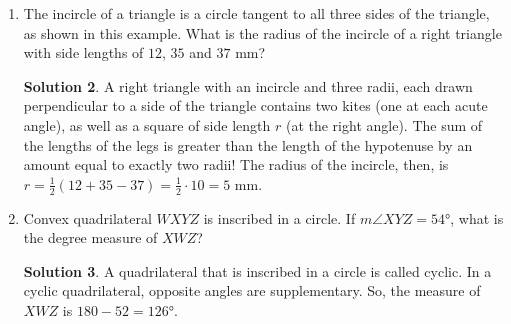 \documentclass{article}
\makeatletter
\newcommand{\arc@char}{{\usefont{U}{tipa}{m}{n}\symbol{62}}}%
\newcommand{\arc}[1]{\mathpalette\arc@arc{#1}}
\newcommand{\arc@arc}[2]{%
  \sbox0{$\m@th#1#2$}%
  \vbox{
    \hbox{\resizebox{\wd0}{\height}{\arc@char}}
    \nointerlineskip
    \box0
  }%
}
\theoremstyle{definition}
\newtheorem*{solution}{Solution}
\makeatother
\begin{document}
\begin{multicols}{2}
\begin{enumerate}
\begin{center}
\begin{tikzpicture}
                \end{tikzpicture}
            \end{center}
            \begin{solution}
                Since $\angle ABC$ is one-half the sum of arc $\arc{AB}$ and arc $\arc{DE}$, we have $\angle ACB = \ang{50}$.
                Since $\angle ACB + \angle AC = \ang{180}$, we find that $\angle ACD = \ang{130}$.
            \end{solution}
        \item The incircle of a triangle is a circle tangent to all three sides of the triangle, as shown in this example.
            What is the radius of the incircle of a right triangle with side lengths of $12$, $35$ and $37$ mm?
            \begin{center}
            \end{center}
            \begin{solution}
                A right triangle with an incircle and three radii, each drawn perpendicular to a side of the triangle contains two kites (one at each acute angle), as well as a square of side length $r$ (at the right angle).
                The sum of the lengths of the legs is greater than the length of the hypotenuse by an amount equal to exactly two radii!
                The radius of the incircle, then, is $r = \frac{1}{2} (12 + 35 - 37) = \frac{1}{2} \cdot 10 = 5$ mm.
            \end{solution}
        \item Convex quadrilateral $WXYZ$ is inscribed in a circle.
            If $m\angle XYZ = \ang{54}$, what is the degree measure of $XWZ$?
            \begin{solution}
                A quadrilateral that is inscribed in a circle is called cyclic.
                In a cyclic quadrilateral, opposite angles are supplementary.
                So, the measure of $XWZ$ is $180 - 52 = \ang{126}$.
            \end{solution}
    \end{enumerate}
\end{multicols}
\end{document}
